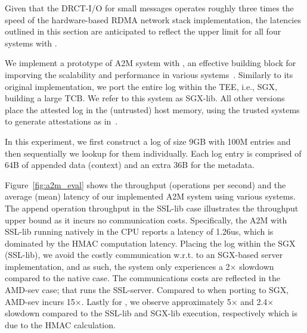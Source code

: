
Given that the DRCT-I/O for small messages operates roughly three times the speed of the hardware-based RDMA network stack implementation, the latencies outlined in this section are anticipated to reflect the upper limit for all four systems with \projecttitle{}.

 We implement a prototype of A2M system with \projecttitle{}, an effective building block for imporving the scalability and performance in various systems~\cite{A2M, sundr, Castro:2002, AbdElMalek2005FaultscalableBF}. Similarly to its original implementation, we port the entire log within the TEE, i.e., SGX, building a large TCB. We refer to this system as SGX-lib. All other versions place the attested log in the (untrusted) host memory, using the trusted systems to generate attestations as in~\cite{levin2009trinc}. %

In this experiment, we first construct a log of size 9GB with 100M entries and then sequentially we lookup for them individually. Each log entry is comprised of 64B of appended data (context) and an extra 36B for the metadata.


 Figure~\ref{fig:a2m_eval} shows the throughput (operations per second) and the average (mean) latency of our implemented A2M system using various systems. The append operation throughput in the SSL-lib case illustrates the throughput upper bound as it incurs no communication costs. Specifically, the A2M with SSL-lib running natively in the CPU reports a latency of 1.26us, which is dominated by the HMAC computation latency.
Placing the log within the SGX (SSL-lib), we avoid the costly communication w.r.t. to an SGX-based server implementation, and as such, the system only experiences a 2$\times$ slowdown compared to the native case. The communications costs are reflected in the AMD-sev case; that runs the SSL-server. Compared to when porting to SGX, AMD-sev incurs 15$\times$. Lastly for \projecttitle{}, we observe approximately 5$\times$ and 2.4$\times$ slowdown compared to the SSL-lib and SGX-lib execution, respectively which is due to the HMAC calculation.

